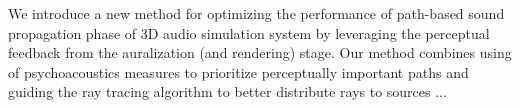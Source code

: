 We introduce a new method for optimizing the performance of path-based sound propagation phase of 3D audio simulation system by leveraging the perceptual feedback from the auralization (and rendering) stage. Our method combines using of psychoacoustics measures to prioritize perceptually important paths and guiding the ray tracing algorithm to better distribute rays to sources ...


